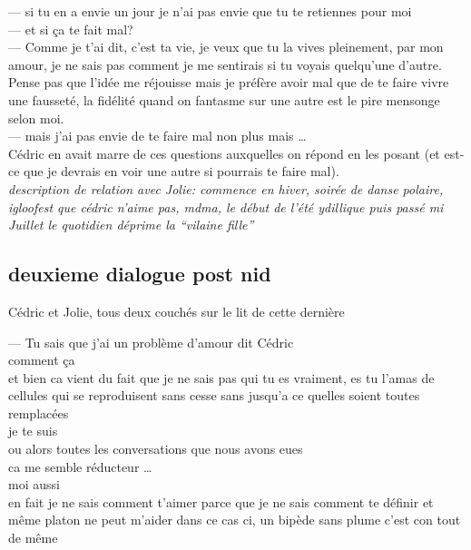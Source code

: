 \documentclass{article}
\begin{document}
--- si tu en a envie un jour je n'ai pas envie que tu te retiennes pour moi\\
--- et si ça te fait mal?\\
--- Comme je t'ai dit, c'est ta vie, je veux que tu la vives pleinement, par mon amour,
je ne sais pas comment je me sentirais si tu voyais quelqu'une d'autre. Pense pas que l'idée
me réjouisse mais je préfère avoir mal que de te faire vivre une fausseté, la fidélité quand on
fantasme sur une autre est le pire mensonge selon moi.\\
--- mais j'ai pas envie de te faire mal non plus mais \ldots \\

Cédric en avait marre de ces questions auxquelles on répond en les posant (et est-ce que
je devrais en voir une autre si pourrais te faire mal).\\

\textit{description de relation avec Jolie:
  commence en hiver, soirée de danse polaire, igloofest que cédric n'aime pas, mdma, le début de l'été
ydillique puis passé mi Juillet le quotidien déprime la ``vilaine fille''}\\
\clearpage


\subsection{deuxieme dialogue post nid}
Cédric et Jolie, tous deux couchés sur le lit de cette dernière

--- Tu sais que j'ai un problème d'amour dit Cédric\\

comment ça\\

et bien ca vient  du fait que je ne sais pas qui tu es vraiment, es
tu l'amas de cellules qui se reproduisent sans cesse sans jusqu'a ce quelles
soient toutes remplacées\\

je te suis\\

ou alors toutes les conversations que nous avons eues\\

ca me semble réducteur \ldots \\

moi aussi\\

en fait je ne sais comment t'aimer parce que je ne sais comment te définir
et même platon ne peut m'aider dans ce cas ci, un bipède sans plume  c'est con
tout de même\\
\end{document}

